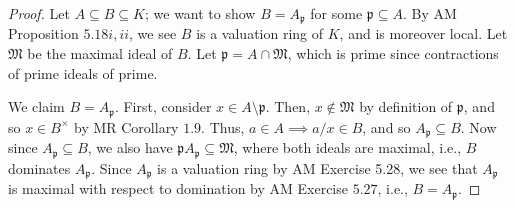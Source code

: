 \documentclass[12pt,letterpaper]{article}
\theoremstyle{definition}
\theoremstyle{remark}
\numberwithin{figure}{problem}
\numberwithin{equation}{section}
\begin{document}
\begin{proof}
  Let $A \subseteq B \subseteq K$; we want to show $B = A_{\mathfrak{p}}$ for some $\mathfrak{p} \subseteq A$. By AM Proposition $5.18i,ii$, we see $B$ is a valuation ring of $K$, and is moreover local. Let $\mathfrak{M}$ be the maximal ideal of $B$. Let $\mathfrak{p} = A \cap \mathfrak{M}$, which is prime since contractions of prime ideals of prime.
  \par We claim $B = A_{\mathfrak{p}}$. First, consider $x \in A \setminus \mathfrak{p}$. Then, $x \notin \mathfrak{M}$ by definition of $\mathfrak{p}$, and so $x \in B^\times$ by MR Corollary $1.9$. Thus, $a \in A \implies a/x \in B$, and so $A_{\mathfrak{p}} \subseteq B$. Now since $A_{\mathfrak{p}} \subseteq B$, we also have $\mathfrak{p}A_{\mathfrak{p}} \subseteq \mathfrak{M}$, where both ideals are maximal, i.e., $B$ dominates $A_{\mathfrak{p}}$. Since $A_{\mathfrak{p}}$ is a valuation ring by AM Exercise 5.28, we see that $A_{\mathfrak{p}}$ is maximal with respect to domination by AM Exercise $5.27$, i.e., $B = A_{\mathfrak{p}}$.
\end{proof}
\end{document}
